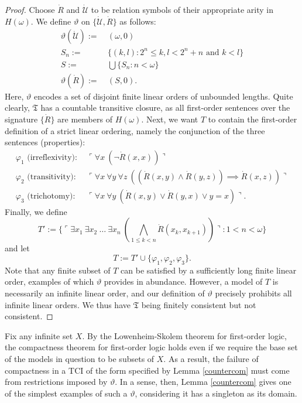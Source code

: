 \documentclass[12pt, twoside]{memoir}
\numberwithin{equation}{section}
\theoremstyle{definition}
\theoremstyle{remark}
\theoremstyle{definition}
\theoremstyle{definition}
\theoremstyle{definition}
\theoremstyle{remark}
\begin{document}
\begin{proof}
Choose $\dot{R}$ and $\dot{\mathcal{U}}$ to be relation symbols of their appropriate arity in $H(\omega)$. We define $\vartheta$ on $\{\dot{\mathcal{U}}, \dot{R}\}$ as follows:
\begin{align*}
    \vartheta(\dot{\mathcal{U}}) := \ & (\omega, 0) \\
    S_n :=  \ & \{(k,l) : 2^n \leq k, l < 2^n + n \text{ and } k < l\} \\
    S := \ & \bigcup \{S_n : n < \omega\} \\
    \vartheta(\dot{R}) := \ & (S, 0).
\end{align*}
Here, $\vartheta$ encodes a set of disjoint finite linear orders of unbounded lengths. Quite clearly, $\mathfrak{T}$ has a countable transitive closure, as all first-order sentences over the signature $\{\dot{R}\}$ are members of $H(\omega)$. Next, we want $T$ to contain the first-order definition of a strict linear ordering, namely the conjunction of the three sentences (properties):
\begin{align*}
    \varphi_1 \text{ (irreflexivity)} : \ & \ulcorner \forall x \ (\neg \dot{R}(x, x)) \urcorner \\
    \varphi_2 \text{ (transitivity)} : \ & \ulcorner \forall x \ \forall y \ \forall z \ ((\dot{R}(x, y) \wedge \dot{R}(y, z)) \implies \dot{R}(x, z)) \urcorner \\
    \varphi_3 \text{ (trichotomy)} : \ & \ulcorner \forall x \ \forall y \ (\dot{R}(x, y) \vee \dot{R}(y, x) \vee y = x) \urcorner.
\end{align*}
Finally, we define $$T' := \{\ulcorner \exists x_1 \ \exists x_2 \ \dots \ \exists x_n \ (\bigwedge_{1 \leq k < n} \dot{R}(x_{k}, x_{k + 1})) \urcorner : 1 < n < \omega\}$$ and let $$T := T' \cup \{\varphi_1, \varphi_2, \varphi_3\}.$$ Note that any finite subset of $T$ can be satisfied by a sufficiently long finite linear order, examples of which $\vartheta$ provides in abundance. However, a model of $T$ is necessarily an infinite linear order, and our definition of $\vartheta$ precisely prohibits all infinite linear orders. We thus have $\mathfrak{T}$ being finitely consistent but not consistent.
\end{proof}

Fix any infinite set $X$. By the Lowenheim-Skolem theorem for first-order logic, the compactness theorem for first-order logic holds even if we require the base set of the models in question to be subsets of $X$. As a result, the failure of compactness in a TCI of the form specified by Lemma \ref{countercom} must come from restrictions imposed by $\vartheta$. In a sense, then, Lemma \ref{countercom} gives one of the simplest examples of such a $\vartheta$, considering it has a singleton as its domain.
\end{document}
